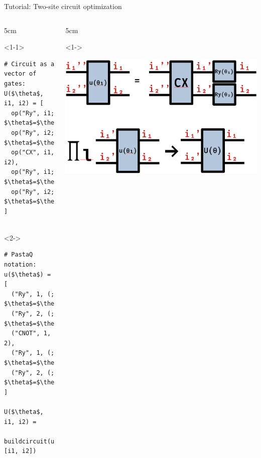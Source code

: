 \begin{frame}[fragile]{Tutorial: Two-site circuit optimization}

\begin{columns}

\begin{column}{5cm}

\begin{onlyenv}<1-1>
\begin{lstlisting}[language=JuliaLocal, style=julia, mathescape, basicstyle=\scriptsize\ttfamily]
# Circuit as a vector of gates:
U($\theta$, i1, i2) = [
  op("Ry", i1; $\theta$=$\theta$[1]),
  op("Ry", i2; $\theta$=$\theta$[2]),
  op("CX", i1, i2),
  op("Ry", i1; $\theta$=$\theta$[3]),
  op("Ry", i2; $\theta$=$\theta$[4]),
]


 \end{lstlisting}
\end{onlyenv}

\begin{onlyenv}<2->
\begin{lstlisting}[language=JuliaLocal, style=julia, mathescape, basicstyle=\scriptsize\ttfamily]
# PastaQ notation:
u($\theta$) = [
  ("Ry", 1, (; $\theta$=$\theta$[1])),
  ("Ry", 2, (; $\theta$=$\theta$[2])),
  ("CNOT", 1, 2),
  ("Ry", 1, (; $\theta$=$\theta$[3])),
  ("Ry", 2, (; $\theta$=$\theta$[4])),
]

U($\theta$, i1, i2) =
  buildcircuit(u($\theta$), [i1, i2])
\end{lstlisting}
\end{onlyenv}

\end{column}

\begin{column}{5cm}

\begin{onlyenv}<1->
\vspace*{0.0cm}
\begin{center}
\includegraphics[width=1.0\textwidth]{
  slides/assets/U12.png
}
\end{center}
\vspace*{0.0cm}
\end{onlyenv}

\end{column}

\end{columns}

\end{frame}
